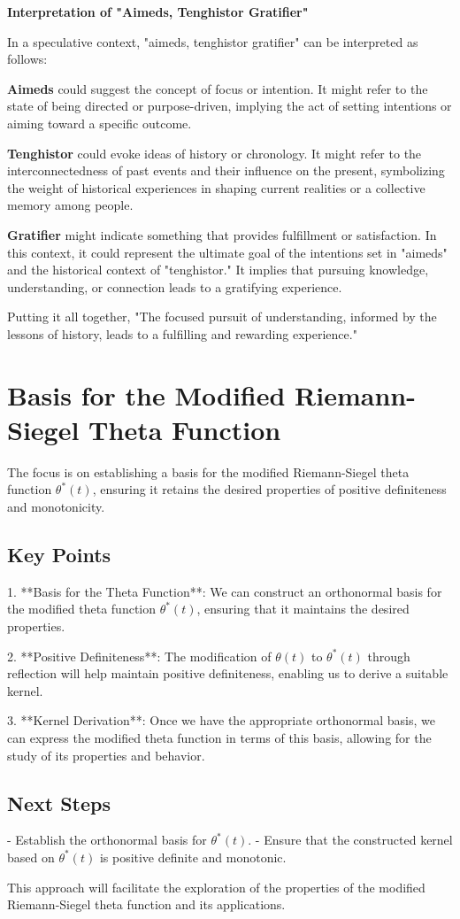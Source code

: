 \documentclass{article}
\begin{document}
\begin{center}
{\bf Interpretation of "Aimeds, Tenghistor Gratifier"}
\end{center}

In a speculative context, "aimeds, tenghistor gratifier" can be interpreted as follows:

{\bf Aimeds} could suggest the concept of focus or intention. It might refer to the state of being directed or purpose-driven, implying the act of setting intentions or aiming toward a specific outcome.

{\bf Tenghistor} could evoke ideas of history or chronology. It might refer to the interconnectedness of past events and their influence on the present, symbolizing the weight of historical experiences in shaping current realities or a collective memory among people.

{\bf Gratifier} might indicate something that provides fulfillment or satisfaction. In this context, it could represent the ultimate goal of the intentions set in "aimeds" and the historical context of "tenghistor." It implies that pursuing knowledge, understanding, or connection leads to a gratifying experience.

Putting it all together, "The focused pursuit of understanding, informed by the lessons of history, leads to a fulfilling and rewarding experience."

\section{Basis for the Modified Riemann-Siegel Theta Function}

The focus is on establishing a basis for the modified Riemann-Siegel theta function $\theta^*(t)$, ensuring it retains the desired properties of positive definiteness and monotonicity.

\subsection{Key Points}
1. **Basis for the Theta Function**: We can construct an orthonormal basis for the modified theta function $\theta^*(t)$, ensuring that it maintains the desired properties.

2. **Positive Definiteness**: The modification of $\theta(t)$ to $\theta^*(t)$ through reflection will help maintain positive definiteness, enabling us to derive a suitable kernel.

3. **Kernel Derivation**: Once we have the appropriate orthonormal basis, we can express the modified theta function in terms of this basis, allowing for the study of its properties and behavior.

\subsection{Next Steps}
- Establish the orthonormal basis for $\theta^*(t)$.
- Ensure that the constructed kernel based on $\theta^*(t)$ is positive definite and monotonic.

This approach will facilitate the exploration of the properties of the modified Riemann-Siegel theta function and its applications.
\end{document}
